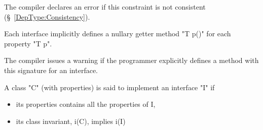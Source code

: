 \begin{staticrule*}
   The compiler declares an error if this constraint
   is not consistent (\S~\ref{DepType:Consistency}).  
\end{staticrule*}

Each interface implicitly defines a nullary getter method \xcd"T p()" for
each property \xcd"T p". 

\begin{staticrule*}
   The compiler issues a warning if the programmer
   explicitly defines a method with this signature for an interface.
\end{staticrule*}

A class \xcd"C" (with properties) is said to implement an interface \xcd"I" if
\begin{itemize}
  \item its properties contains all the properties of I,
\item its class invariant, i(C), implies i(I)
\end{itemize}

